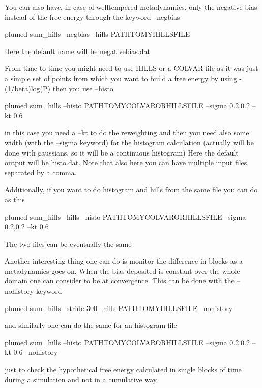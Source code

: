 You can also have, in case of welltempered metadynamics, only the negative bias instead of the free energy through the keyword --negbias

\begin{DoxyVerb}plumed sum_hills --negbias --hills PATHTOMYHILLSFILE   
\end{DoxyVerb}


Here the default name will be negativebias.\+dat

From time to time you might need to use H\+I\+L\+L\+S or a C\+O\+L\+V\+A\+R file as it was just a simple set of points from which you want to build a free energy by using -\/(1/beta)log(\+P) then you use --histo

\begin{DoxyVerb}plumed sum_hills --histo PATHTOMYCOLVARORHILLSFILE  --sigma 0.2,0.2 --kt 0.6  
\end{DoxyVerb}


in this case you need a --kt to do the reweighting and then you need also some width (with the --sigma keyword) for the histogram calculation (actually will be done with gaussians, so it will be a continuous histogram) Here the default output will be histo.\+dat. Note that also here you can have multiple input files separated by a comma.

Additionally, if you want to do histogram and hills from the same file you can do as this \begin{DoxyVerb}plumed sum_hills --hills --histo PATHTOMYCOLVARORHILLSFILE  --sigma 0.2,0.2 --kt 0.6  
\end{DoxyVerb}
 The two files can be eventually the same

Another interesting thing one can do is monitor the difference in blocks as a metadynamics goes on. When the bias deposited is constant over the whole domain one can consider to be at convergence. This can be done with the --nohistory keyword

\begin{DoxyVerb}plumed sum_hills --stride 300 --hills PATHTOMYHILLSFILE  --nohistory 
\end{DoxyVerb}


and similarly one can do the same for an histogram file

\begin{DoxyVerb}plumed sum_hills --histo PATHTOMYCOLVARORHILLSFILE  --sigma 0.2,0.2 --kt 0.6 --nohistory 
\end{DoxyVerb}


just to check the hypothetical free energy calculated in single blocks of time during a simulation and not in a cumulative way

